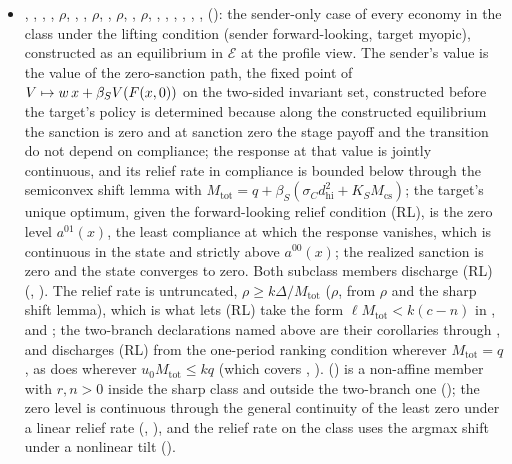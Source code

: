 \begin{itemize}[leftmargin=1.4em,itemsep=1pt]
\item {}, , , , $\rho$, , , $\rho$, , $\rho$, , $\rho$, , , , , , ,  (): the sender-only case of every economy in the class under the lifting condition (sender forward-looking, target myopic), constructed as an equilibrium in $\mathcal E$ at the profile view. The sender's value is the value of the zero-sanction path, the fixed point of $V\mapsto w\,x+\beta_SV(F(x,0))$ on the two-sided invariant set, constructed before the target's policy is determined because along the constructed equilibrium the sanction is zero and at sanction zero the stage payoff and the transition do not depend on compliance; the response at that value is jointly continuous, and its relief rate in compliance is bounded below through the semiconvex shift lemma with $M_{\mathrm{tot}}=q+\beta_S(\sigma_Cd_{\mathrm{hi}}^2+K_SM_{\mathrm{cs}})$; the target's unique optimum, given the forward-looking relief condition (RL), is the zero level $a^{01}(x)$, the least compliance at which the response vanishes, which is continuous in the state and strictly above $a^{00}(x)$; the realized sanction is zero and the state converges to zero. Both subclass members discharge (RL) (, ). The relief rate is untruncated, $\rho\ge k\Delta/M_{\mathrm{tot}}$ ($\rho$, from $\rho$ and the sharp shift lemma), which is what lets (RL) take the form $\ell M_{\mathrm{tot}}<k(c-n)$ in ,  and ; the two-branch declarations named above are their corollaries through , and  discharges (RL) from the one-period ranking condition wherever $M_{\mathrm{tot}}=q$, as does  wherever $u_0M_{\mathrm{tot}}\le kq$ (which covers , ).  () is a non-affine member with $r,n>0$ inside the sharp class and outside the two-branch one (); the zero level is continuous through the general continuity of the least zero under a linear relief rate (, ), and the relief rate on the class uses the argmax shift under a nonlinear tilt ().

\end{itemize}
